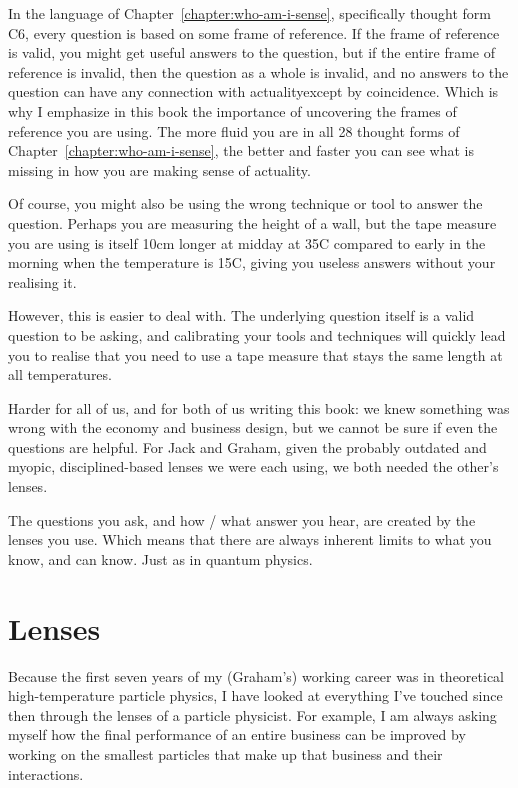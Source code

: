 In the language of Chapter~\ref{chapter:who-am-i-sense}, specifically thought form C6, every question is based on some frame of reference. If the frame of reference is valid, you might get useful answers to the question, but if the entire frame of reference is invalid, then the question as a whole is invalid, and no answers to the question can have any connection with actuality\textemdash except by coincidence. Which is why I emphasize in this book the importance of uncovering the frames of reference you are using. The more fluid you are in all 28 thought forms of Chapter~\ref{chapter:who-am-i-sense}, the better and faster you can see what is missing in how you are making sense of actuality.


Of course, you might also be using the wrong technique or tool to answer the question. Perhaps you are measuring the height of a wall, but the tape measure you are using is itself 10cm longer at midday at 35\textdegree{}C compared to early in the morning when the temperature is 15\textdegree{}C, giving you useless answers without your realising it. 


However, this is easier to deal with. The underlying question itself is a valid question to be asking, and calibrating your tools and techniques will quickly lead you to realise that you need to use a tape measure that stays the same length at all temperatures.


Harder for all of us, and for both of us writing this book: we knew something was wrong with the economy and business design, but we cannot be sure if even the questions are helpful. For Jack and Graham, given the probably outdated and myopic, disciplined-based lenses we were each using, we both needed the other’s lenses. 


The questions you ask, and how / what answer you hear, are created by the lenses you use. Which means that there are always inherent limits to what you know, and can know. Just as in quantum physics.




\section{Lenses}


Because the first seven years of my (Graham’s) working career was in theoretical high-temperature particle physics, I have looked at everything I've touched since then through the lenses of a particle physicist. For example, I am always asking myself how the final performance of an entire business can be improved by working on the smallest particles that make up that business and their interactions. 


